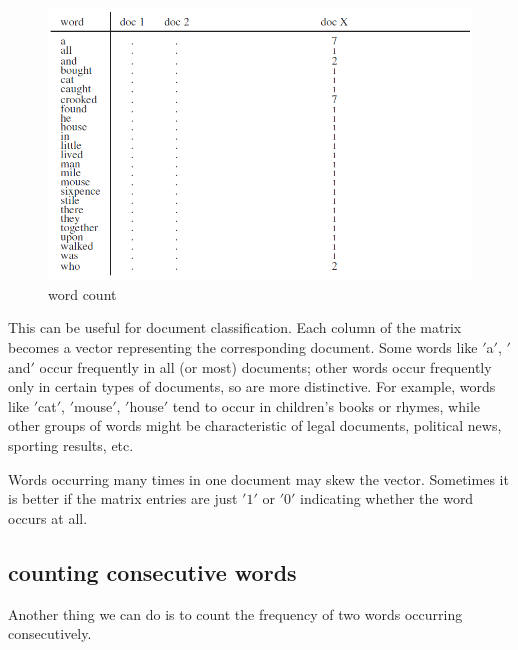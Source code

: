 \documentclass[11pt]{article}
\begin{document}
\begin{figure}[H]
    \centering
    \includegraphics{../out/images/word-count}
    \caption[word count]{word count}
    \label{fig:word count}
\end{figure}

This can be useful for document classification.
Each column of the matrix becomes a vector representing the corresponding document.
Some words like \('\)a\('\), \('\)and\('\) occur frequently in all (or most) documents;
other words occur frequently only in certain types of documents, so are more distinctive.
For example, words like \('\)cat\('\), \('\)mouse\('\), \('\)house\('\) tend to occur in children’s books or rhymes, while other groups of words might be characteristic of legal documents, political news, sporting results, etc.

Words occurring many times in one document may skew the vector.
Sometimes it is better if the matrix entries are just \('1'\) or \('0'\) indicating whether the word occurs at all.

\subsection{counting consecutive words}\label{subsec:counting-consecutive-words}
Another thing we can do is to count the frequency of two words occurring consecutively.
\end{document}
